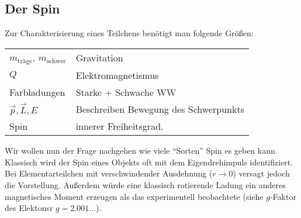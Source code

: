 \subsection{Der Spin}
Zur Charakterisierung eines Teilchens benötigt man folgende Größen:

\begin{tabular}[H]{ll}
$m_\text{träge}$, $m_\text{schwer}$ & Gravitation\\
$Q$ & Elektromagnetismus\\
Farbladungen & Starke + Schwache WW\\
$\vec{p},\vec{L},E$ & Beschreiben Bewegung des Schwerpunkts\\
Spin & innerer Freiheitsgrad.
\end{tabular}

Wir wollen nun der Frage nachgehen wie viele ``Sorten'' Spin es geben kann.
Klassisch wird der Spin eines Objekts oft mit dem Eigendrehimpuls
identifiziert. Bei Elementarteilchen mit
verschwindender Ausdehnung ($r\to0$) versagt jedoch die Vorstellung. Außerdem
würde eine klassisch rotierende Ladung ein anderes magnetisches Moment erzeugen
als das experimentell beobachtete (siehe $g$-Faktor des Elektonsr
$g=2.001\ldots$).

